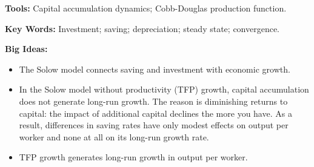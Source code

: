 \textbf{Tools:} Capital accumulation dynamics; Cobb-Douglas production function.

\textbf{Key Words:} Investment; saving; depreciation; steady state; convergence.

\textbf{Big Ideas:}
\begin{itemize}
    \item The Solow model connects saving and investment with economic growth.
    \item In the Solow model without productivity (TFP) growth, capital accumulation does not generate long-run growth. The reason is diminishing returns to capital: the impact of additional capital declines the more you have.  As a result, differences in saving rates have only modest effects on output per worker and none at all on its long-run growth rate.
    \item TFP growth generates long-run growth in output per worker.
\end{itemize}
